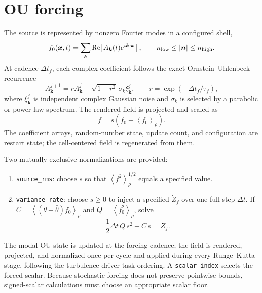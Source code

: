 \documentclass[10pt]{article}
\newcommand{\avg}[1]{\left\langle #1\right\rangle_\rho}
\begin{document}
\section{OU forcing}

The source is represented by nonzero Fourier modes in a configured shell,
\begin{equation}
  f_0(\boldsymbol{x},t)
  = \sum_{\boldsymbol{k}}
    \operatorname{Re}\!\left[A_{\boldsymbol{k}}(t)
    e^{i\boldsymbol{k}\cdot\boldsymbol{x}}\right],
  \qquad n_{\rm low}\leq |\boldsymbol{n}|\leq n_{\rm high}.
\end{equation}
At cadence $\Delta t_f$, each complex coefficient follows the exact
Ornstein--Uhlenbeck recurrence
\begin{equation}
 A_{\boldsymbol{k}}^{j+1}
 = r A_{\boldsymbol{k}}^j+\sqrt{1-r^2}\,\sigma_k\xi_{\boldsymbol{k}}^j,
 \qquad r=\exp(-\Delta t_f/\tau_f),
\end{equation}
where $\xi_{\boldsymbol{k}}^j$ is independent complex Gaussian noise and
$\sigma_k$ is selected by a parabolic or power-law spectrum.  The rendered
field is projected and scaled as
\begin{equation}
  f=s\left(f_0-\avg{f_0}\right).
\end{equation}
The coefficient arrays, random-number state, update count, and configuration
are restart state; the cell-centered field is regenerated from them.

Two mutually exclusive normalizations are provided:
\begin{enumerate}
  \item \texttt{source\_rms}: choose $s$ so that
    $\avg{f^2}^{1/2}$ equals a specified value.
  \item \texttt{variance\_rate}: choose $s\geq0$ to inject a specified
    $\dot Z_f$ over one full step $\Delta t$.  If
    $C=\avg{(\theta-\bar{\theta})f_0}$ and $Q=\avg{f_0^2}$, solve
    \begin{equation}
      \frac{1}{2}\Delta t\,Q\,s^2+C\,s=\dot Z_f .
    \end{equation}
\end{enumerate}
The modal OU state is updated at the forcing cadence; the field is rendered,
projected, and normalized once per cycle and applied during every
Runge--Kutta stage, following the turbulence-driver task ordering.  A
\texttt{scalar\_index} selects the forced scalar.  Because stochastic forcing
does not preserve pointwise bounds, signed-scalar calculations must choose an
appropriate scalar floor.
\end{document}
